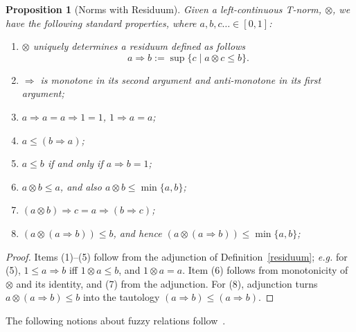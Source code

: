 \documentclass{article}
\def\eg{{\em e.g. }}
\newtheorem{proposition}{Proposition}[section]
\begin{document}
\begin{proposition}[Norms with Residuum] \label{first} Given a left-continuous T-norm, $\otimes$, we have the following standard properties, where $a,b,c \ldots \in [0,1]$:
\begin{enumerate}
\item\label{first1} $\otimes$ uniquely determines a \emph{residuum} defined as follows
\[a \Rightarrow b := \sup\{c \mid a\otimes c \leq b \}.\]
\item\label{first2} $\Rightarrow$ is monotone in its second argument and anti-monotone in its first argument;
\item\label{first3} $a\Rightarrow a = a\Rightarrow 1=1$, $1\Rightarrow a=a$;
\item\label{first4} $a\leq (b \Rightarrow a)$;
\item\label{first5} $a\leq b$ if and only if $a\Rightarrow b = 1$; 
\item\label{first6} $a\otimes b\leq a$, and also $a\otimes b\leq \min\{a,b\}$;

\item\label{first7} $(a\otimes b)\Rightarrow c = a\Rightarrow( b\Rightarrow c)$;

\item\label{first8} $(a\otimes (a\Rightarrow b))\leq b$, and hence $(a\otimes (a\Rightarrow b))\leq \min\{a,b\}$;
\end{enumerate} 
\end{proposition}
\begin{proof}
Items (1)--(5) follow from the adjunction of Definition~\ref{residuum}; \eg for (5),
$1\leq a\Rightarrow b$ iff $1\otimes a \leq b$, and $1\otimes a=a$. Item (6) follows from
monotonicity of $\otimes$ and its identity, and (7) from the adjunction. For (8),
adjunction turns $a\otimes (a\Rightarrow b) \leq b$ into the tautology
$(a\Rightarrow b) \leq (a\Rightarrow b)$.
\end{proof}

\noindent The following notions about fuzzy relations follow~\cite{Sessa2002}.
\end{document}
